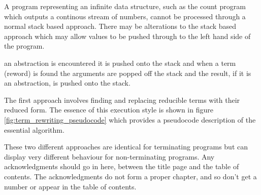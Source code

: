 A program representing an infinite data structure, such as the count
program which outputs a continous stream of numbers, cannot be
processed through a normal stack based approach. There may be alterations
to the stack based approach which may allow values to be pushed 
through to the left hand side of the program.


an abstraction is
encountered it is pushed onto the stack and when a term (reword)
is found the arguments are popped off the stack and the 
result, if it is an abstraction, is pushed onto the stack.

The first approach involves finding and replacing
reducible terms with their reduced form. The essence of this
execution style is shown in figure 
\ref{fig:term_rewriting_pseudocode} which provides a pseudocode
description of the essential algorithm.

These two different approaches are identical for
terminating programs but can display very different behaviour
for non-terminating programs.
Any acknowledgments should go 
in here, between the title page and the table of contents.  The 
acknowledgments do not form a proper chapter, and so don't get a 
number or appear in the table of contents.
